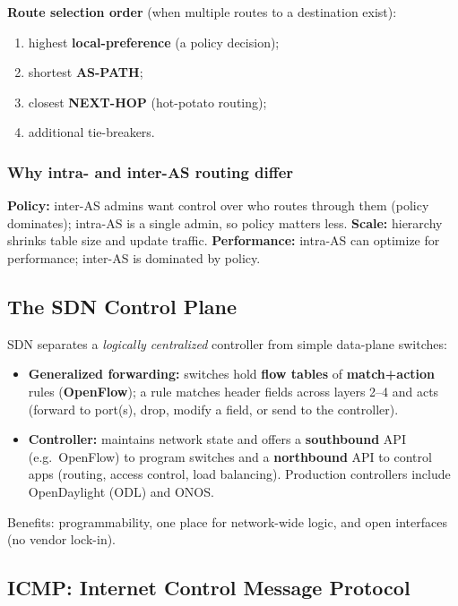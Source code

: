 \documentclass[hidelinks]{article}
\begin{document}
\textbf{Route selection order} (when multiple routes to a destination exist):
\begin{enumerate}
    \item highest \textbf{local-preference} (a policy decision);
    \item shortest \textbf{AS-PATH};
    \item closest \textbf{NEXT-HOP} (hot-potato routing);
    \item additional tie-breakers.
\end{enumerate}

\subsubsection{Why intra- and inter-AS routing differ}
\textbf{Policy:} inter-AS admins want control over who routes through them
(policy dominates); intra-AS is a single admin, so policy matters less.
\textbf{Scale:} hierarchy shrinks table size and update traffic.
\textbf{Performance:} intra-AS can optimize for performance; inter-AS is
dominated by policy.

\subsection{The SDN Control Plane}

SDN separates a \emph{logically centralized} controller from simple data-plane
switches:
\begin{itemize}
    \item \textbf{Generalized forwarding:} switches hold \textbf{flow tables}
    of \textbf{match+action} rules (\textbf{OpenFlow}); a rule matches header
    fields across layers 2--4 and acts (forward to port(s), drop, modify a
    field, or send to the controller).
    \item \textbf{Controller:} maintains network state and offers a
    \textbf{southbound} API (e.g.\ OpenFlow) to program switches and a
    \textbf{northbound} API to control apps (routing, access control, load
    balancing). Production controllers include OpenDaylight (ODL) and ONOS.
\end{itemize}
Benefits: programmability, one place for network-wide logic, and open
interfaces (no vendor lock-in).

\subsection{ICMP: Internet Control Message Protocol}
\end{document}
